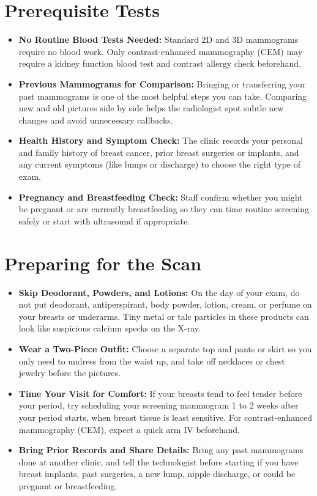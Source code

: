 \section{Prerequisite Tests}

\begin{itemize}
    \item \textbf{No Routine Blood Tests Needed:} Standard 2D and 3D mammograms require no blood work. Only contrast-enhanced mammography (CEM) may require a kidney function blood test and contrast allergy check beforehand.
    \item \textbf{Previous Mammograms for Comparison:} Bringing or transferring your past mammograms is one of the most helpful steps you can take. Comparing new and old pictures side by side helps the radiologist spot subtle new changes and avoid unnecessary callbacks.
    \item \textbf{Health History and Symptom Check:} The clinic records your personal and family history of breast cancer, prior breast surgeries or implants, and any current symptoms (like lumps or discharge) to choose the right type of exam.
    \item \textbf{Pregnancy and Breastfeeding Check:} Staff confirm whether you might be pregnant or are currently breastfeeding so they can time routine screening safely or start with ultrasound if appropriate.
\end{itemize}

\section{Preparing for the Scan}

\begin{itemize}
    \item \textbf{Skip Deodorant, Powders, and Lotions:} On the day of your exam, do not put deodorant, antiperspirant, body powder, lotion, cream, or perfume on your breasts or underarms. Tiny metal or talc particles in these products can look like suspicious calcium specks on the X-ray.
    \item \textbf{Wear a Two-Piece Outfit:} Choose a separate top and pants or skirt so you only need to undress from the waist up, and take off necklaces or chest jewelry before the pictures.
    \item \textbf{Time Your Visit for Comfort:} If your breasts tend to feel tender before your period, try scheduling your screening mammogram 1 to 2 weeks after your period starts, when breast tissue is least sensitive. For contrast-enhanced mammography (CEM), expect a quick arm IV beforehand.
    \item \textbf{Bring Prior Records and Share Details:} Bring any past mammograms done at another clinic, and tell the technologist before starting if you have breast implants, past surgeries, a new lump, nipple discharge, or could be pregnant or breastfeeding.
\end{itemize}


